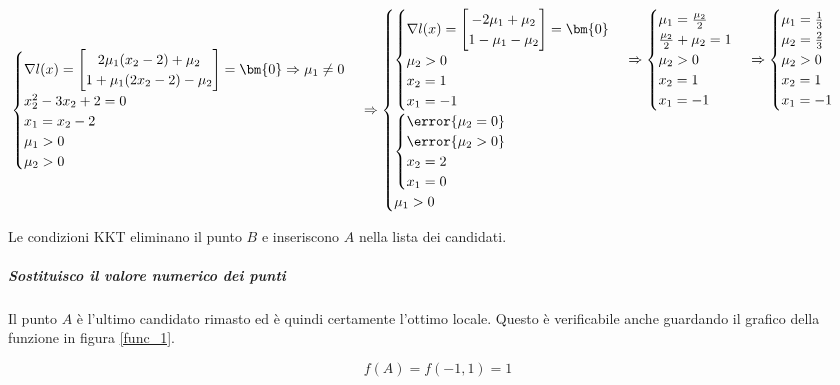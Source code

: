 \documentclass[\main/main.tex]{subfiles}
\begin{document}
\[
  \begin{cases}
    \nabla l(x) = \begin{bmatrix}
      2\mu_1(x_2 - 2) + \mu_2 \\
      1 + \mu_1 (2x_2 - 2) - \mu_2
    \end{bmatrix}
    = \bm{0}  \Rightarrow \mu_1 \neq 0 \\
    x_2^2  -3x_2 + 2 = 0               \\
    x_1 = x_2 - 2                      \\
    \mu_1 > 0                          \\
    \mu_2 > 0
  \end{cases}
  \Rightarrow
  \begin{cases}
    \begin{cases}
      \nabla l(x) = \begin{bmatrix}
        -2\mu_1 + \mu_2 \\
        1 - \mu_1 - \mu_2
      \end{bmatrix}
      = \bm{0}  \\
      \mu_2 > 0 \\
      x_2 = 1   \\
      x_1 = -1
    \end{cases}
    \Rightarrow
    \begin{cases}
      \mu_1 = \frac{\mu_2}{2}     \\
      \frac{\mu_2}{2} + \mu_2 = 1 \\
      \mu_2 > 0                   \\
      x_2 = 1                     \\
      x_1 = -1
    \end{cases}
    \Rightarrow
    \begin{cases}
      \mu_1 = \frac{1}{3} \\
      \mu_2 = \frac{2}{3} \\
      \mu_2 > 0           \\
      x_2 = 1             \\
      x_1 = -1
    \end{cases}
    \\
    \begin{cases}
      \error{\mu_2 = 0} \\
      \error{\mu_2 > 0} \\
      x_2 = 2           \\
      x_1 = 0
    \end{cases} \\
    \mu_1 > 0                  \\
  \end{cases}
\]

Le condizioni KKT eliminano il punto $B$ e inseriscono $A$ nella lista dei candidati.

\subparagraph*{Sostituisco il valore numerico dei punti}
Il punto $A$ è l'ultimo candidato rimasto ed è quindi certamente l'ottimo locale. Questo è verificabile anche guardando il grafico della funzione in figura \ref{func_1}.

\[
  f(A) = f(-1, 1) = 1
\]
\end{document}
